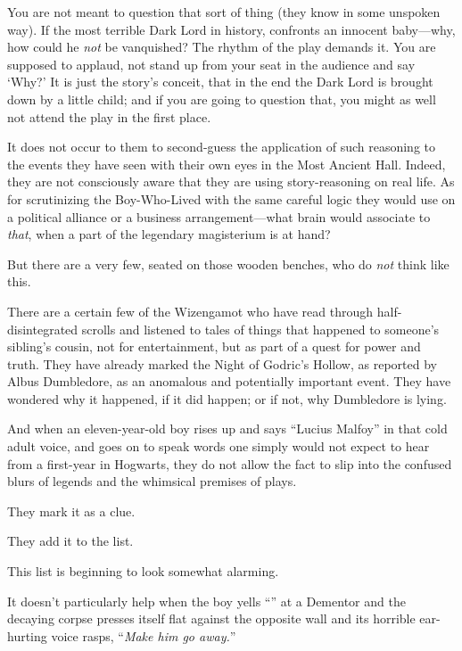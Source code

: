 You are not meant to question that sort of thing (they know in some unspoken way). If the most terrible Dark Lord in history, confronts an innocent baby—why, how could he \emph{not} be vanquished? The rhythm of the play demands it. You are supposed to applaud, not stand up from your seat in the audience and say ‘Why?’ It is just the story’s conceit, that in the end the Dark Lord is brought down by a little child; and if you are going to question that, you might as well not attend the play in the first place.

It does not occur to them to second-guess the application of such reasoning to the events they have seen with their own eyes in the Most Ancient Hall. Indeed, they are not consciously aware that they are using story-reasoning on real life. As for scrutinizing the Boy-Who-Lived with the same careful logic they would use on a political alliance or a business arrangement—what brain would associate to \emph{that}, when a part of the legendary magisterium is at hand?

But there are a very few, seated on those wooden benches, who do \emph{not} think like this.

There are a certain few of the Wizengamot who have read through half-disintegrated scrolls and listened to tales of things that happened to someone’s sibling’s cousin, not for entertainment, but as part of a quest for power and truth. They have already marked the Night of Godric’s Hollow, as reported by Albus Dumbledore, as an anomalous and potentially important event. They have wondered why it happened, if it did happen; or if not, why Dumbledore is lying.

And when an eleven-year-old boy rises up and says “Lucius Malfoy” in that cold adult voice, and goes on to speak words one simply would not expect to hear from a first-year in Hogwarts, they do not allow the fact to slip into the confused blurs of legends and the whimsical premises of plays.

They mark it as a clue.

They add it to the list.

This list is beginning to look somewhat alarming.

It doesn’t particularly help when the boy yells “” at a Dementor and the decaying corpse presses itself flat against the opposite wall and its horrible ear-hurting voice rasps, “\emph{Make him go away.}”

